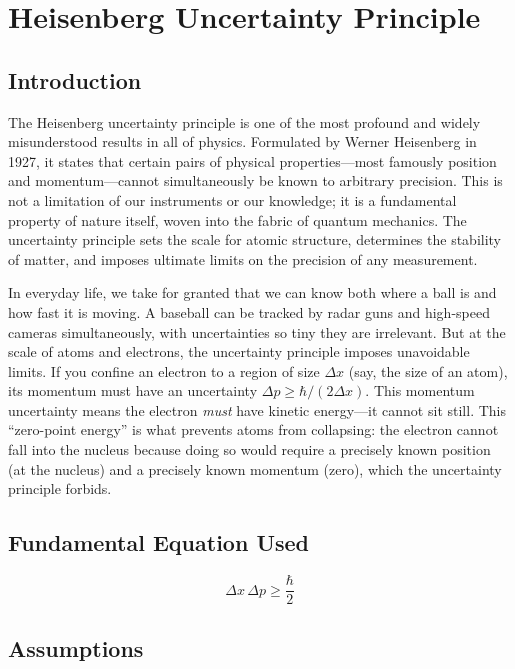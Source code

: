 \documentclass[11pt,openright]{book}
\begin{document}

\chapter{Heisenberg Uncertainty Principle}

\section*{Introduction}

The Heisenberg uncertainty principle is one of the most profound and widely misunderstood results in all of physics. Formulated by Werner Heisenberg in 1927, it states that certain pairs of physical properties---most famously position and momentum---cannot simultaneously be known to arbitrary precision. This is not a limitation of our instruments or our knowledge; it is a fundamental property of nature itself, woven into the fabric of quantum mechanics. The uncertainty principle sets the scale for atomic structure, determines the stability of matter, and imposes ultimate limits on the precision of any measurement.

In everyday life, we take for granted that we can know both where a ball is and how fast it is moving. A baseball can be tracked by radar guns and high-speed cameras simultaneously, with uncertainties so tiny they are irrelevant. But at the scale of atoms and electrons, the uncertainty principle imposes unavoidable limits. If you confine an electron to a region of size $\Delta x$ (say, the size of an atom), its momentum must have an uncertainty $\Delta p \geq \hbar/(2\Delta x)$. This momentum uncertainty means the electron \emph{must} have kinetic energy---it cannot sit still. This ``zero-point energy'' is what prevents atoms from collapsing: the electron cannot fall into the nucleus because doing so would require a precisely known position (at the nucleus) and a precisely known momentum (zero), which the uncertainty principle forbids.
\section*{Fundamental Equation Used}

\begin{equation}
\Delta x\,\Delta p \geq \frac{\hbar}{2}
\end{equation}
\section*{Assumptions}
\end{document}
